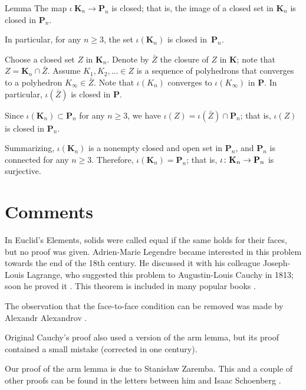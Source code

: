 \begin{thm}{Lemma}
The map $\iota\:\mathbf{K}_n\to\mathbf{P}_n$ is closed;
that is, the image of a closed set in $\mathbf{K}_n$ is closed in $\mathbf{P}_n$.

In particular, for any $n\ge 3$, the set $\iota(\mathbf{K}_n)$ is closed in~$\mathbf{P}_n$.
\end{thm}

Choose a closed set $Z$ in $\mathbf{K}_n$.
Denote by $\bar Z$ the closure of $Z$ in $\mathbf{K}$; note that $Z=\mathbf{K}_n\cap \bar Z$.
Assume $K_1,K_2,\dots\in Z$ is a sequence of polyhedrons that converges to a polyhedron $K_\infty\in\bar Z$.
Note that $\iota(K_n)$ converges to $\iota(K_\infty)$ in $\mathbf{P}$.
In particular, $\iota(\bar Z)$ is closed in $\mathbf{P}$.

Since $\iota(\mathbf{K}_n)\subset \mathbf{P}_n$ for any $n\ge 3$, we have $\iota (Z)=\iota(\bar Z)\cap \mathbf{P}_n$;
that is, $\iota (Z)$ is closed in $\mathbf{P}_n$. 

\medskip

Summarizing, $\iota(\mathbf{K}_n)$ is a nonempty closed and open set in $\mathbf{P}_n$, and $\mathbf{P}_n$ is connected for any $n\ge 3$.
Therefore, $\iota(\mathbf{K}_n)=\mathbf{P}_n$; that is, $\iota\:\mathbf{K}_n\z\to\mathbf{P}_n$ is surjective.
\qeds

\section{Comments}

In Euclid's Elements, 
solids were called equal if the same holds for their faces, but no proof was given.
Adrien-Marie Legendre became interested in this problem towards the end of the 18th century.
He discussed it with his colleague Joseph-Louis Lagrange, who suggested this problem to Augustin-Louis Cauchy in 1813; soon he proved it \cite{cauchy}.
This theorem is included in many popular books \cite{aigner-zigler,dolbilin,tabacnikov-fuks}.

The observation that the face-to-face condition can be removed was made by 
Alexandr Alexandrov \cite{alexandrov-1941}.

Original Cauchy's proof \cite{cauchy}
also used a version of the arm lemma, but its proof contained a small mistake (corrected in one century).

Our proof of the arm lemma is due to Stanisław Zaremba.
This and a couple of other proofs can be found in the letters between him and Isaac Schoenberg \cite{schoenberg-zaremba}.

